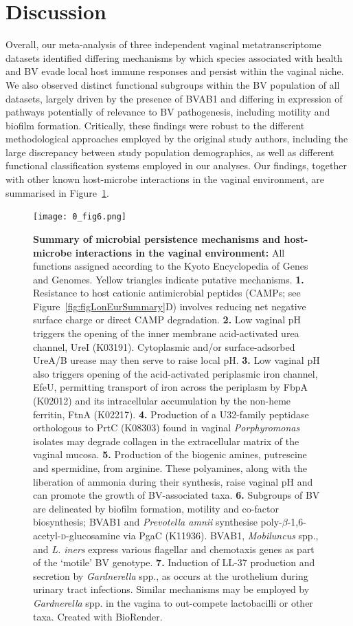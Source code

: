 \documentclass[sn-mathphys,Numbered]{sn-jnl}%
\begin{document}
\section{Discussion}\label{sec:secDisc}

Overall, our meta-analysis of three independent vaginal metatranscriptome datasets identified differing mechanisms by which species associated with health and BV evade local host immune responses and persist within the vaginal niche. We also observed distinct functional subgroups within the BV population of all datasets, largely driven by the presence of BVAB1 and differing in expression of pathways potentially of relevance to BV pathogenesis, including motility and biofilm formation. Critically, these findings were robust to the different methodological approaches employed by the original study authors, including the large discrepancy between study population demographics, as well as different functional classification systems employed in our analyses. Our findings, together with other known host-microbe interactions in the vaginal environment, are summarised in Figure~\ref{fig:figMechSummary}.

\begin{figure}[h]
\centering
\texttt{[image: 0\_fig6.png]}
\caption{\textbf{Summary of microbial persistence mechanisms and host-microbe interactions in the vaginal environment:} All functions assigned according to the Kyoto Encyclopedia of Genes and Genomes. Yellow triangles indicate putative mechanisms. \textbf{1.} Resistance to host cationic antimicrobial peptides (CAMPs; see Figure~\ref{fig:figLonEurSummary}D) involves reducing net negative surface charge or direct CAMP degradation. \textbf{2.} Low vaginal pH triggers the opening of the inner membrane acid-activated urea channel, UreI (K03191). Cytoplasmic and/or surface-adsorbed UreA/B urease may then serve to raise local pH. \textbf{3.} Low vaginal pH also triggers opening of the acid-activated periplasmic iron channel, EfeU, permitting transport of iron across the periplasm by FbpA (K02012) and its intracellular accumulation by the non-heme ferritin, FtnA (K02217). \textbf{4.} Production of a U32-family peptidase orthologous to PrtC (K08303) found in vaginal \textit{Porphyromonas} isolates may degrade collagen in the extracellular matrix of the vaginal mucosa. \textbf{5.} Production of the biogenic amines, putrescine and spermidine, from arginine. These polyamines, along with the liberation of ammonia during their synthesis, raise vaginal pH and can promote the growth of BV-associated taxa. \textbf{6.} Subgroups of BV are delineated by biofilm formation, motility and co-factor biosynthesis; BVAB1 and \textit{Prevotella amnii} synthesise poly-$\beta$-1,6-acetyl-\textsc{d}-glucosamine via PgaC (K11936). BVAB1, \textit{Mobiluncus} spp., and \textit{L. iners} express various flagellar and chemotaxis genes as part of the `motile' BV genotype. \textbf{7.} Induction of LL-37 production and secretion by \textit{Gardnerella} spp., as occurs at the urothelium during urinary tract infections. Similar mechanisms may be employed by \textit{Gardnerella} spp. in the vagina to out-compete lactobacilli or other taxa. Created with BioRender.}\label{fig:figMechSummary}
\end{figure}
\end{document}
